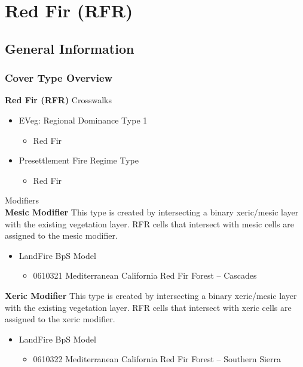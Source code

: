 \newpage
\section{Red Fir (RFR)}
\label{rfr-description}

\subsection*{General Information}

\subsubsection{Cover Type Overview}

\textbf{Red Fir (RFR)}
\newline
Crosswalks
\begin{itemize}
	\item EVeg: Regional Dominance Type 1
	\begin{itemize}
		\item Red Fir
	\end{itemize}

	\item Presettlement Fire Regime Type
	\begin{itemize}
		\item Red Fir
	\end{itemize}
\end{itemize}


\noindent Modifiers \\
\medskip
\noindent \textbf{Mesic Modifier } This type is created by intersecting a binary xeric/mesic layer with the existing vegetation layer. RFR cells that intersect with mesic cells are assigned to the mesic modifier.
\begin{itemize}
	\item LandFire BpS Model
	\begin{itemize}
		\item 0610321 Mediterranean California Red Fir Forest – Cascades
	\end{itemize}
\end{itemize}

\noindent \textbf{Xeric Modifier} This type is created by intersecting a binary xeric/mesic layer with the existing vegetation layer. RFR cells that intersect with xeric cells are assigned to the xeric modifier.
\begin{itemize}
	\item LandFire BpS Model
	\begin{itemize}
		\item 0610322 Mediterranean California Red Fir Forest – Southern Sierra
	\end{itemize}
\end{itemize}

